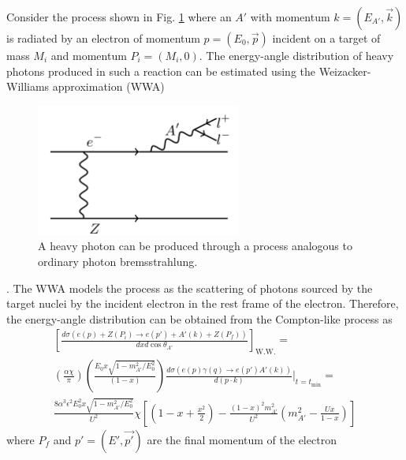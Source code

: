 Consider the process shown in Fig. \ref{fig:ap_production} where an $A'$ with
momentum $k = (E_{A'}, \vec{k})$ is radiated by an electron of momentum 
$p = (E_0, \vec{p})$ incident on a target of mass $M_i$ and momentum 
$P_i = (M_i, 0)$. The energy-angle distribution of heavy photons produced in 
such a reaction can be estimated using the Weizacker-Williams approximation (WWA)
\begin{figure}[t]
    \centering
    \includegraphics[width=0.6\textwidth]{images/aprime_brem.png}
    \caption{A heavy photon can be produced through a process analogous to 
             ordinary photon bremsstrahlung.}
    \label{fig:ap_production}
\end{figure}  
\cite{Bjorken:2009mm, Tsai:1986tx, Tsai:1973py, Kim:1973he}.
The WWA models the process as the scattering of photons sourced by the target 
nuclei by the incident electron
in the rest frame of the electron.  Therefore, the energy-angle distribution
can be obtained from the Compton-like process as
\begin{equation}
    \begin{split}
        \left[ \frac{d\sigma(e(p) + Z(P_i) \rightarrow e(p') + A'(k) + Z(P_f))}{dx d\cos\theta_{A'}} \right]_{\text{W.W.}} = \\
        \left( \frac{\alpha \chi}{\pi} \right) \left(\frac{E_0 x \sqrt{ 1 - m_{A'}^2/E_0^2}}{(1 - x)} \right) 
        \frac{d\sigma(e(p)\gamma(q) \rightarrow e(p') A'(k))}{d(p \cdot k)} |_{t = t_{\text{min}}} = \\
    \frac{8 \alpha^{3} \epsilon^{2} E_{0}^2 x \sqrt{1-m_{A'}^{2}/E_{0}^{2}}}{U^{2}} \chi
    \left [ \left (1 - x + \frac{x^{2}}{2} \right )  - \frac{(1-x)^{2} m_{A'}^{2}}{U^{2}}
    \left(m_{A'}^{2} - \frac{Ux}{1-x} \right) \right]
    \end{split}
    \label{eqn:ap_diff_cross}
\end{equation}
where $P_f$ and $p' = (E', \vec{p'})$ are the final momentum of the electron
